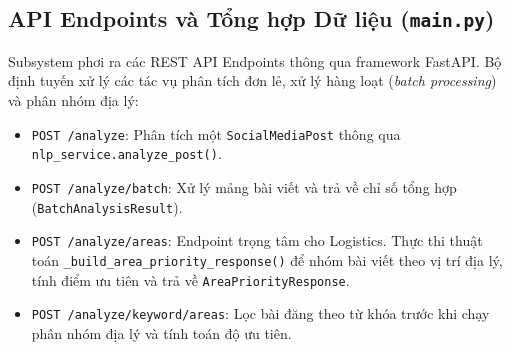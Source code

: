 \documentclass[12pt,a4paper]{article}
\begin{document}
\subsection{API Endpoints và Tổng hợp Dữ liệu (\texttt{main.py})}
Subsystem phơi ra các REST API Endpoints thông qua framework FastAPI. Bộ định tuyến xử lý các tác vụ phân tích đơn lẻ, xử lý hàng loạt (\textit{batch processing}) và phân nhóm địa lý:
\begin{itemize}
    \item \texttt{POST /analyze}: Phân tích một \texttt{SocialMediaPost} thông qua \texttt{nlp\_service.analyze\_post()}.
    \item \texttt{POST /analyze/batch}: Xử lý mảng bài viết và trả về chỉ số tổng hợp (\texttt{BatchAnalysisResult}).
    \item \texttt{POST /analyze/areas}: Endpoint trọng tâm cho Logistics. Thực thi thuật toán \texttt{\_build\_area\_priority\_response()} để nhóm bài viết theo vị trí địa lý, tính điểm ưu tiên và trả về \texttt{AreaPriorityResponse}.
    \item \texttt{POST /analyze/keyword/areas}: Lọc bài đăng theo từ khóa trước khi chạy phân nhóm địa lý và tính toán độ ưu tiên.
\end{itemize}
\end{document}
